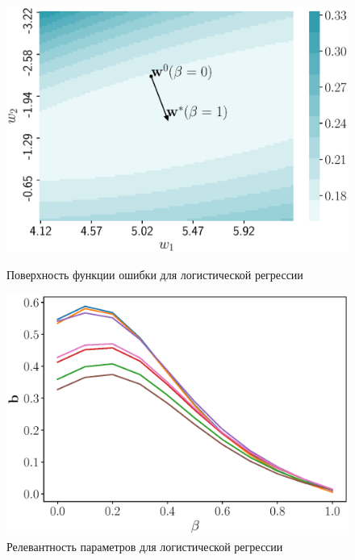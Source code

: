 \begin{figure}[h]
	\centering
	\begin{minipage}{.47\textwidth}
		\centering
		\includegraphics[width=\linewidth]{figs/ch3/log_reg_error}
		\caption{Поверхность функции ошибки для логистической регрессии}
		\label{ch3:fig:log_reg_error}
	\end{minipage}%
	\begin{minipage}{.47\textwidth}
		\centering
		\includegraphics[width=\linewidth]{figs/ch3/log_reg_b_wrt_beta}
		\caption{Релевантность параметров для логистической регрессии}
		\label{ch3:fig:log_reg_b_wrt_beta}
	\end{minipage}
\end{figure}

